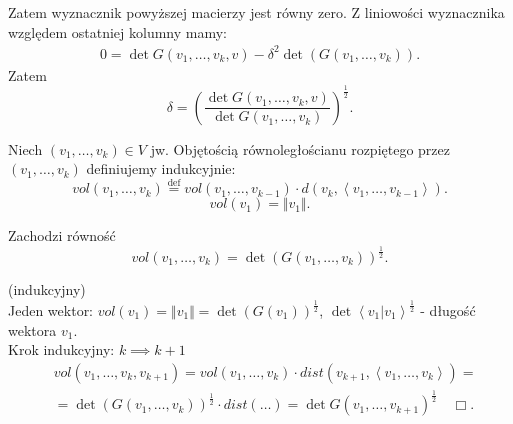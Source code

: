 \documentclass[../main.tex]{subfiles}
\begin{document}
    Zatem wyznacznik powyższej macierzy jest równy zero. Z liniowości wyznacznika względem ostatniej kolumny mamy:
     \begin{align*}
         0 = \det G(v_1,\ldots,v_k,v) - \delta^2 \det (G(v_1,\ldots,v_k))
    .\end{align*}
    Zatem
    \[
        \delta = \left(\frac{\det G(v_1,\ldots,v_k,v)}{\det G(v_1,\ldots,v_k)}\right)^{\frac{1}{2}}
    .\]
    \begin{definicja}
        Niech $(v_1,\ldots,v_k)\in V$ jw. Objętością równoległościanu rozpiętego przez $\left( v_1,\ldots,v_k \right) $ definiujemy indukcyjnie:
        \[
            vol(v_1,\ldots,v_k) \overset{\text{def}}{=} vol(v_1,\ldots,v_{k-1}) \cdot d(v_k,\left<v_1,\ldots,v_{k-1} \right>)
        .\]
        \[
            vol(v_1) = \Vert v_1 \Vert
        .\]
    \end{definicja}
    \begin{stw}
        Zachodzi równość
        \[
            vol(v_1,\ldots,v_k) = \det(G(v_1,\ldots,v_k))^{\frac{1}{2}}
        .\]
    \end{stw}
    \begin{dowod}
        (indukcyjny)\\
        Jeden wektor: $vol(v_1) = \Vert v_1 \Vert = \det(G(v_1))^{\frac{1}{2}}$, $\det \left<v_1|v_1 \right>^{\frac{1}{2}}$ - długość wektora $v_1$.\\
        Krok indukcyjny: $k\implies k+1$\\
        \begin{align*}
            &vol(v_1,\ldots,v_k,v_{k+1}) = vol(v_1,\ldots,v_k)\cdot dist(v_{k+1},\left<v_1,\ldots,v_k \right>)=\\
            &=\det (G(v_1,\ldots,v_k))^{\frac{1}{2}}\cdot dist(\ldots) = \det G(v_1,\ldots,v_{k+1})^{\frac{1}{2}}\quad\Box
        .\end{align*}
    \end{dowod}
\end{document}

